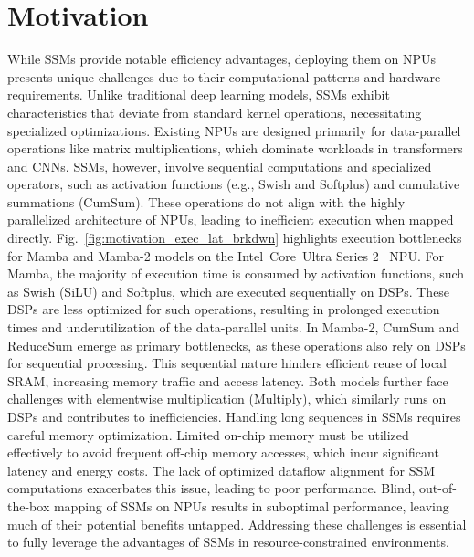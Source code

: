 \section{Motivation} \label{sec_motivation}


While SSMs provide notable efficiency advantages, deploying them on NPUs presents unique challenges due to their computational patterns and hardware requirements. Unlike traditional deep learning models, SSMs exhibit characteristics that deviate from standard kernel operations, necessitating specialized optimizations. Existing NPUs are designed primarily for data-parallel operations like matrix multiplications, which dominate workloads in transformers and CNNs. SSMs, however, involve sequential computations and specialized operators, such as activation functions (e.g., Swish and Softplus) and cumulative summations (CumSum). These operations do not align with the highly parallelized architecture of NPUs, leading to inefficient execution when mapped directly. Fig.~\ref{fig:motivation_exec_lat_brkdwn} highlights execution bottlenecks for Mamba and Mamba-2 models on the Intel\textregistered\ Core\texttrademark\ Ultra Series 2~\cite{lnl} NPU. For Mamba, the majority of execution time is consumed by activation functions, such as Swish (SiLU) and Softplus, which are executed sequentially on DSPs. These DSPs are less optimized for such operations, resulting in prolonged execution times and underutilization of the data-parallel units. In Mamba-2, CumSum and ReduceSum emerge as primary bottlenecks, as these operations also rely on DSPs for sequential processing. This sequential nature hinders efficient reuse of local SRAM, increasing memory traffic and access latency. Both models further face challenges with elementwise multiplication (Multiply), which similarly runs on DSPs and contributes to inefficiencies. Handling long sequences in SSMs requires careful memory optimization. Limited on-chip memory must be utilized effectively to avoid frequent off-chip memory accesses, which incur significant latency and energy costs. The lack of optimized dataflow alignment for SSM computations exacerbates this issue, leading to poor performance. Blind, out-of-the-box mapping of SSMs on NPUs results in suboptimal performance, leaving much of their potential benefits untapped. Addressing these challenges is essential to fully leverage the advantages of SSMs in resource-constrained environments.




